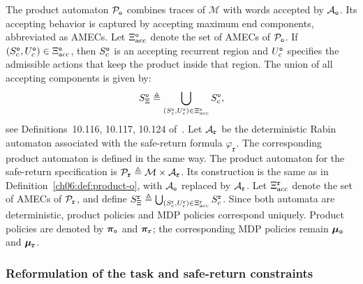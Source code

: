 The product automaton \(\mathcal{P}_{\textup{\texttt{o}}}\) combines traces
of \(\mathcal{M}\) with words accepted by
\(\mathcal{A}_{\textup{\texttt{o}}}\). Its accepting behavior is captured by
accepting maximum end components, abbreviated as AMECs. Let
\(\Xi_{\mathrm{acc}}^{\textup{\texttt{o}}}\) denote the set of AMECs of
\(\mathcal{P}_{\textup{\texttt{o}}}\). If
\((S^{\textup{\texttt{o}}}_{c}, U^{\textup{\texttt{o}}}_{c}) \in
\Xi_{\mathrm{acc}}^{\textup{\texttt{o}}}\), then
\(S^{\textup{\texttt{o}}}_{c}\) is an accepting recurrent region and
\(U^{\textup{\texttt{o}}}_{c}\) specifies the admissible actions that keep
the product inside that region. The union of all accepting components is
given by:
\begin{equation}
\label{ch06:eq:AMECs}
S^{\textup{\texttt{o}}}_{\Xi} \triangleq
\bigcup_{
(S^{\textup{\texttt{o}}}_{c},U^{\textup{\texttt{o}}}_{c})
\in \Xi_{\mathrm{acc}}^{\textup{\texttt{o}}}
}
S^{\textup{\texttt{o}}}_{c},
\end{equation}
see Definitions~10.116, 10.117, 10.124 of~\citet{baier2008principles}.
Let \(\mathcal{A}_{\textup{\texttt{r}}}\) be the deterministic Rabin
automaton associated with the safe-return formula
\(\varphi_{\texttt{r}}\). The corresponding product automaton is defined in
the same way.
The product automaton for the safe-return specification is
\(\mathcal{P}_{\textup{\texttt{r}}} \triangleq
\mathcal{M} \times \mathcal{A}_{\textup{\texttt{r}}}\). Its construction is
the same as in Definition~\ref{ch06:def:product-o}, with
\(\mathcal{A}_{\textup{\texttt{o}}}\) replaced by
\(\mathcal{A}_{\textup{\texttt{r}}}\). Let
\(\Xi_{\mathrm{acc}}^{\textup{\texttt{r}}}\) denote the set of AMECs of
\(\mathcal{P}_{\textup{\texttt{r}}}\), and define
$S^{\textup{\texttt{r}}}_{\Xi} \triangleq
\bigcup_{
(S^{\textup{\texttt{r}}}_{c},U^{\textup{\texttt{r}}}_{c})
\in \Xi_{\mathrm{acc}}^{\textup{\texttt{r}}}
}S^{\textup{\texttt{r}}}_{c}$.
Since both automata are deterministic, product policies and MDP policies
correspond uniquely. Product policies are denoted by
\(\boldsymbol{\pi}_{\textup{\texttt{o}}}\) and
\(\boldsymbol{\pi}_{\textup{\texttt{r}}}\); the corresponding MDP policies
remain \(\boldsymbol{\mu}_{\textup{\texttt{o}}}\) and
\(\boldsymbol{\mu}_{\textup{\texttt{r}}}\).

\subsubsection{Reformulation of the task and safe-return constraints}
\label{ch06:subsec:task-reformulate}

